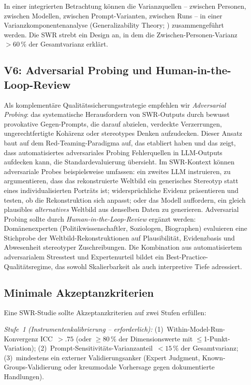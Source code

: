 \documentclass[11pt,a4paper]{article}
\theoremstyle{definition}
\theoremstyle{plain}
\theoremstyle{remark}
\begin{document}
In einer integrierten Betrachtung k\"onnen die Varianzquellen -- zwischen Personen, zwischen Modellen, zwischen Prompt-Varianten, zwischen Runs -- in einer Varianzkomponentenanalyse (Generalizability Theory; \citealp{Brennan2001}) zusammengef\"uhrt werden. Die SWR strebt ein Design an, in dem die Zwischen-Personen-Varianz $>$60\,\% der Gesamtvarianz erkl\"art.


\subsection{V6: Adversarial Probing und Human-in-the-Loop-Review}
\label{sec:adversarial}

Als komplement\"are Qualit\"atssicherungsstrategie empfehlen wir \emph{Adversarial Probing}: das systematische Herausfordern von SWR-Outputs durch bewusst provokative Gegen-Prompts, die darauf abzielen, verdeckte Verzerrungen, ungerechtfertigte Koh\"arenz oder stereotypes Denken aufzudecken. Dieser Ansatz baut auf dem Red-Teaming-Paradigma auf, das \citet{Perez2022} etabliert haben und das zeigt, dass automatisiertes adversariales Probing Fehlerquellen in LLM-Outputs aufdecken kann, die Standardevaluierung \"ubersieht. Im SWR-Kontext k\"onnen adversariale Probes beispielsweise umfassen: ein zweites LLM instruieren, zu argumentieren, dass das rekonstruierte Weltbild ein generisches Stereotyp statt eines individualisierten Portr\"ats ist; widerspr\"uchliche Evidenz pr\"asentieren und testen, ob die Rekonstruktion sich anpasst; oder das Modell auffordern, ein gleich plausibles \emph{alternatives} Weltbild aus denselben Daten zu generieren. Adversarial Probing sollte durch \emph{Human-in-the-Loop-Review} erg\"anzt werden: Dom\"anenexperten (Politikwissenschaftler, Soziologen, Biographen) evaluieren eine Stichprobe der Weltbild-Rekonstruktionen auf Plausibilit\"at, Evidenzbasis und Abwesenheit stereotyper Zuschreibungen. Die Kombination aus automatisiertem adversarialem Stresstest und Expertenurteil bildet ein Best-Practice-Qualit\"atsregime, das sowohl Skalierbarkeit als auch interpretive Tiefe adressiert.

\subsection{Minimale Akzeptanzkriterien}
\label{sec:akzeptanz}

Eine SWR-Studie sollte Akzeptanzkriterien auf zwei Stufen erf\"ullen:

\emph{Stufe~1 (Instrumentenkalibrierung -- erforderlich):} (1)~Within-Model-Run-Konvergenz ICC~$> .75$ (oder $\geq 80\,\%$ der Dimensionswerte mit $\leq$1-Punkt-Variation); (2)~Prompt-Sensitivit\"ats-Varianzanteil~$< 15\,\%$ der Gesamtvarianz; (3)~mindestens ein externer Validierungsanker (Expert Judgment, Known-Groups-Validierung oder kreuzmodale Vorhersage gegen dokumentierte Handlungen).
\end{document}
